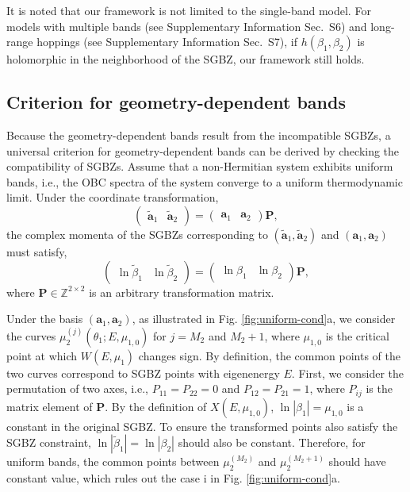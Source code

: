 \documentclass[pdflatex,sn-nature,iicol]{sn-jnl}
\theoremstyle{thmstyleone}%
\theoremstyle{thmstyletwo}%
\theoremstyle{thmstylethree}%
\begin{document}
It is noted that our framework is not limited to the single-band model. For models with multiple bands (see Supplementary Information Sec.~S6) and long-range hoppings (see Supplementary Information Sec.~S7), if $h(\beta_1,\beta_2)$ is holomorphic in the neighborhood of the SGBZ, our framework still holds.


\subsection{Criterion for geometry-dependent bands}

Because the geometry-dependent bands result from the incompatible
SGBZs, a universal criterion for geometry-dependent bands can be derived
by checking the compatibility of SGBZs. Assume that a non-Hermitian
system exhibits uniform bands, i.e., the OBC spectra of the system
converge to a uniform thermodynamic limit. Under the coordinate transformation,
\begin{equation}
\begin{pmatrix}\tilde{\mathbf{a}}_{1} & \tilde{\mathbf{a}}_{2}\end{pmatrix}=\begin{pmatrix}\mathbf{a}_{1} & \mathbf{a}_{2}\end{pmatrix}\mathbf{P},
\end{equation}
the complex momenta of the SGBZs corresponding to $(\tilde{\mathbf{a}}_{1},\tilde{\mathbf{a}}_{2})$
and $(\mathbf{a}_{1},\mathbf{a}_{2})$ must satisfy, 
\begin{equation}
\begin{pmatrix}\ln\tilde{\beta}_{1} & \ln\tilde{\beta}_{2}\end{pmatrix}=\begin{pmatrix}\ln\beta_{1} & \ln\beta_{2}\end{pmatrix}\mathbf{P},\label{eq:trans-beta}
\end{equation}
where $\mathbf{P}\in\mathbb{Z}^{2\times2}$ is an arbitrary transformation
matrix.

Under the basis $(\mathbf{a}_{1},\mathbf{a}_{2})$, as illustrated
in Fig. \ref{fig:uniform-cond}a, we consider the curves $\mu_{2}^{(j)}(\theta_{1};E,\mu_{1,0})$
for $j=M_{2}$ and $M_{2}+1$, where $\mu_{1,0}$ is the critical
point at which $W(E,\mu_{1})$ changes sign. By definition, the common
points of the two curves correspond to SGBZ points with eigenenergy
$E$. First, we consider the permutation of two axes, i.e., $P_{11}=P_{22}=0$
and $P_{12}=P_{21}=1$, where $P_{ij}$ is the matrix element of $\mathbf{P}$.
By the definition of $X(E,\mu_{1,0})$, $\ln|\beta_{1}|=\mu_{1,0}$
is a constant in the original SGBZ. To ensure the transformed points
also satisfy the SGBZ constraint, $\ln|\tilde{\beta}_{1}|=\ln|\beta_{2}|$
should also be constant. Therefore, for uniform bands, the common
points between $\mu_{2}^{(M_{2})}$ and $\mu_{2}^{(M_{2}+1)}$ should
have constant value, which rules out the case i in Fig. \ref{fig:uniform-cond}a.
\end{document}
